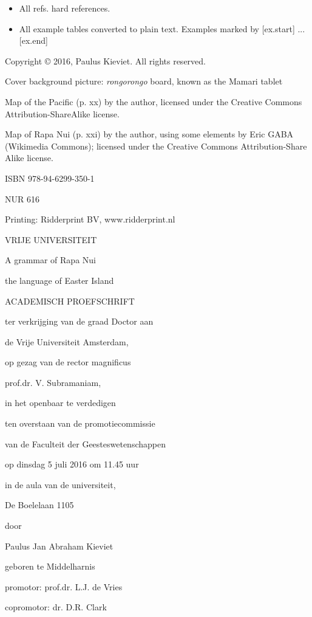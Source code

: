




 

\begin{itemize}
\item All refs. hard references.

\item All example tables converted to plain text. Examples marked by [ex.start] ... [ex.end]

\end{itemize}


Copyright © 2016, Paulus Kieviet. All rights reserved.

Cover background picture: \textit{rongorongo} board, known as the Mamari tablet

Map of the Pacific (p. xx) by the author, licensed under the Creative Commons Attribution-ShareAlike license.

Map of Rapa Nui (p. xxi) by the author, using some elements by Eric GABA (Wikimedia Commons); licensed under the Creative Commons Attribution-Share Alike license.

ISBN 978-94-6299-350-1

NUR 616

Printing: Ridderprint BV, www.ridderprint.nl


VRIJE UNIVERSITEIT


A grammar of Rapa Nui


the language of Easter Island

ACADEMISCH PROEFSCHRIFT

ter verkrijging van de graad Doctor aan

de Vrije Universiteit Amsterdam,

op gezag van de rector magnificus

prof.dr. V. Subramaniam,

in het openbaar te verdedigen

ten overstaan van de promotiecommissie

van de Faculteit der Geesteswetenschappen

op dinsdag 5 juli 2016 om 11.45 uur

in de aula van de universiteit,

De Boelelaan 1105

door

Paulus Jan Abraham Kieviet

geboren te Middelharnis


promotor: prof.dr. L.J. de Vries

copromotor: dr. D.R. Clark
